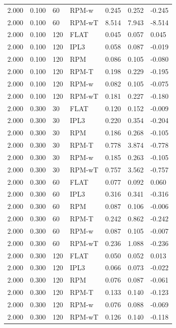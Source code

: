 \begin{tabular}{lllllll}
2.000 & 0.100 & 60 & RPM-w & 0.245 & 0.252 & -0.245 \\
2.000 & 0.100 & 60 & RPM-wT & 8.514 & 7.943 & -8.514 \\
2.000 & 0.100 & 120 & FLAT & 0.045 & 0.057 & 0.045 \\
2.000 & 0.100 & 120 & IPL3 & 0.058 & 0.087 & -0.019 \\
2.000 & 0.100 & 120 & RPM & 0.086 & 0.105 & -0.080 \\
2.000 & 0.100 & 120 & RPM-T & 0.198 & 0.229 & -0.195 \\
2.000 & 0.100 & 120 & RPM-w & 0.082 & 0.105 & -0.075 \\
2.000 & 0.100 & 120 & RPM-wT & 0.181 & 0.227 & -0.180 \\
2.000 & 0.300 & 30 & FLAT & 0.120 & 0.152 & -0.009 \\
2.000 & 0.300 & 30 & IPL3 & 0.220 & 0.354 & -0.204 \\
2.000 & 0.300 & 30 & RPM & 0.186 & 0.268 & -0.105 \\
2.000 & 0.300 & 30 & RPM-T & 0.778 & 3.874 & -0.778 \\
2.000 & 0.300 & 30 & RPM-w & 0.185 & 0.263 & -0.105 \\
2.000 & 0.300 & 30 & RPM-wT & 0.757 & 3.562 & -0.757 \\
2.000 & 0.300 & 60 & FLAT & 0.077 & 0.092 & 0.060 \\
2.000 & 0.300 & 60 & IPL3 & 0.316 & 0.341 & -0.316 \\
2.000 & 0.300 & 60 & RPM & 0.087 & 0.106 & -0.006 \\
2.000 & 0.300 & 60 & RPM-T & 0.242 & 0.862 & -0.242 \\
2.000 & 0.300 & 60 & RPM-w & 0.087 & 0.105 & -0.007 \\
2.000 & 0.300 & 60 & RPM-wT & 0.236 & 1.088 & -0.236 \\
2.000 & 0.300 & 120 & FLAT & 0.050 & 0.052 & 0.013 \\
2.000 & 0.300 & 120 & IPL3 & 0.066 & 0.073 & -0.022 \\
2.000 & 0.300 & 120 & RPM & 0.076 & 0.087 & -0.061 \\
2.000 & 0.300 & 120 & RPM-T & 0.133 & 0.140 & -0.123 \\
2.000 & 0.300 & 120 & RPM-w & 0.076 & 0.088 & -0.069 \\
2.000 & 0.300 & 120 & RPM-wT & 0.126 & 0.140 & -0.118 \\
\hline
\end{tabular}
